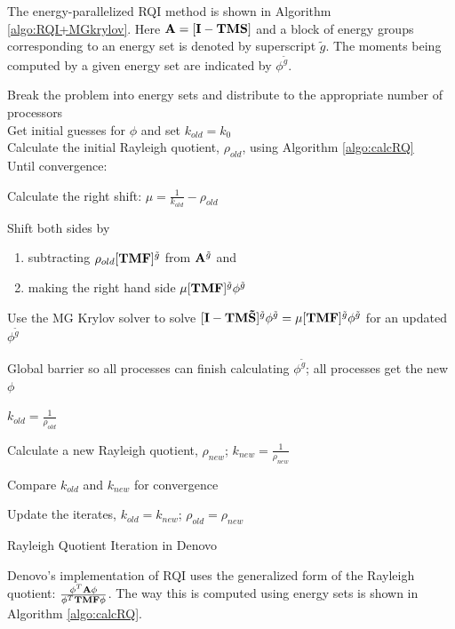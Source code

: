 The energy-parallelized RQI method is shown in Algorithm \ref{algo:RQI+MGkrylov}. Here $\mathbf{A} = [\mathbf{I} - \mathbf{TMS}]$ and a block of energy groups corresponding to an energy set is denoted by superscript ${\tilde{g}}$. The moments being computed by a given energy set are indicated by $\phi^{\tilde{g}}$.
%
\begin{algorithm}[!h]
  Break the problem into energy sets and distribute to the appropriate number of processors\\
  Get initial guesses for $\phi$ and set $k_{old} = k_{0}$\\
  Calculate the initial Rayleigh quotient, $\rho_{old}$, using Algorithm \ref{algo:calcRQ}\\
  Until convergence:
  \begin{list}{}{\hspace{2.5em}}
     \item Calculate the right shift: $\mu = \frac{1}{k_{old}} - \rho_{old}$
     \item Shift both sides by 
     \begin{enumerate}
       \item subtracting $\rho_{old} [\mathbf{TMF}]^{\tilde{g}}$ from $\mathbf{A}^{\tilde{g}}$ and 
       \item making the right hand side $\mu [\mathbf{TMF}]^{\tilde{g}} \phi^{\tilde{g}}$
    \end{enumerate}
    \item Use the MG Krylov solver to solve $[\mathbf{I} - \mathbf{TM\tilde{S}}]^{\tilde{g}}\phi^{\tilde{g}} = \mu [\mathbf{TMF}]^{\tilde{g}} \phi^{\tilde{g}}$ for an updated $\phi^{\tilde{g}}$
    \item Global barrier so all processes can finish calculating $\phi^{\tilde{g}}$; all processes get the new $\phi$
    \item $k_{old} = \frac{1}{\rho_{old}}$
    \item Calculate a new Rayleigh quotient, $\rho_{new}$; $k_{new} = \frac{1}{\rho_{new}}$
    \item Compare $k_{old}$ and $k_{new}$ for convergence 
    \item Update the iterates, $k_{old} = k_{new}$; $\rho_{old} = \rho_{new}$
  \end{list}
  \caption{Rayleigh Quotient Iteration in Denovo}
  \label{algo:RQI+MGkrylov}
\end{algorithm}
%
Denovo's implementation of RQI uses the generalized form of the Rayleigh quotient: $\frac{\phi^{T} \mathbf{A} \phi}{\phi^{T} \mathbf{TMF} \phi}$. The way this is computed using energy sets is shown in Algorithm \ref{algo:calcRQ}. 
